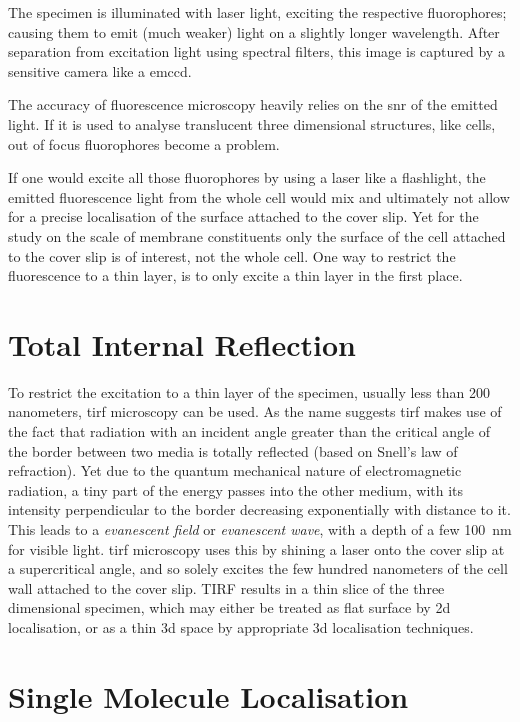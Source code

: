 \documentclass[11pt, a4paper, oneside, twocolumn]{report}
\newcommand{\e}{\emph}
\newcommand{\x}[1]{#1\index{#1}}
\begin{document}
The specimen is illuminated with laser light, exciting the respective
\x{fluorophores}; causing them to emit (much weaker) light on a
slightly longer wavelength. After separation from excitation light
using spectral filters, this image is captured by a sensitive camera
like a \gls{emccd}.

The accuracy of fluorescence microscopy heavily relies on the
\gls{snr} of the emitted light. If it is used to analyse translucent
three dimensional structures, like cells, out of focus fluorophores
become a problem.

If one would excite all those fluorophores by using a laser like a
flashlight, the emitted fluorescence light from the whole cell would
mix and ultimately not allow for a precise localisation of the surface
attached to the cover slip. Yet for the study on the scale of membrane
constituents only the surface of the cell attached to the cover slip
is of interest, not the whole cell. One way to restrict the
fluorescence to a thin layer, is to only excite a thin layer in the
first place.


\section{Total Internal Reflection}

To restrict the excitation to a thin layer of the specimen, usually
less than 200 nanometers, \gls{tirf} microscopy can be used. As the
name suggests \gls{tirf} makes use of the fact that radiation with an
incident angle greater than the critical angle of the border between
two media is totally reflected (based on Snell’s law of
refraction). Yet due to the quantum mechanical nature of
electromagnetic radiation, a tiny part of the energy passes into the
other medium, with its intensity perpendicular to the border
decreasing exponentially with distance to it. This leads to a
\e{\x{evanescent field}} or \e{\x{evanescent wave}}, with a depth of a
few \SI{100}{nm} for visible light. \gls{tirf} microscopy uses this by
shining a laser onto the cover slip at a supercritical angle, and so
solely excites the few hundred nanometers of the cell wall attached to
the cover slip. TIRF results in a thin slice of the three dimensional
specimen, which may either be treated as flat surface by 2d
localisation, or as a thin 3d space by appropriate 3d localisation
techniques.


\section{Single Molecule Localisation}
\end{document}
